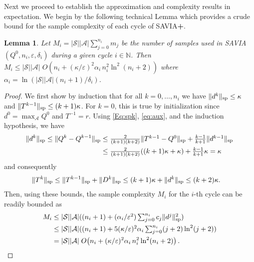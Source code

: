 \documentclass{article}
\newcommand{\cA}{\mathcal{A}}
\newcommand{\cS}{\mathcal{S}}
\newcommand{\NN}{\mathbb{N}}
\renewcommand{\sp}[1]{\|{#1}\|_\text{\rm sp}}
\newcommand{\R}{r}
\theoremstyle{plain}
\newtheorem{lemma}[theorem]{Lemma}
\theoremstyle{definition}
\theoremstyle{remark}
\begin{document}
Next we proceed to establish the approximation and complexity results in expectation. We begin by the following technical Lemma which provides a crude bound for the sample complexity of each cycle of {\rm SAVIA\textbf{+}}.

\begin{lemma}\label{le:rough}
Let $M_i= |\cS||\cA|\mbox{$\sum_{j=0}^{n_i} m_j$}$ be the number of samples used in
\mbox{\rm SAVIA}$(Q^0,n_i,\varepsilon,\delta_i)$ during a given cycle $i \in \NN$. Then
$M_i\leq |\cS||\cA|\;O\!\left (n_i+(\kappa/\varepsilon)^2\alpha_i\, n_i^2 \ln^2(n_i+2) \right )$
where $\alpha_i= \ln(|\cS||\cA|(n_i\!+\!1)/\delta_i)$.

\end{lemma}
\begin{proof}
We first show by induction that for all $k=0,\ldots,n_i$ we have $\sp{d^k} \le \kappa$ and $\sp{T^{k-1}} \le (k+1) \kappa$. For $k=0$, this is true by initialization since $d^0=\max_\cA Q^0$ and $T^{-1}=\R$. Using \eqref{Eq:spk}, \eqref{eq:aux}, and the induction hypothesis, we have
\begin{align*}
    \sp{d^k}\le \sp{Q^{k}-Q^{k-1}} &\le \mbox{$ \frac{2}{(k+1)(k+2)}\sp{T^{k-1}-Q^0} + \frac{k-1}{k+1}\sp{d^{k-1}}$}\\
    &\le \mbox{$\frac{2}{(k+1)(k+2)}((k+1)\kappa + \kappa) + \frac{k-1}{k+1}\kappa=\kappa$}
    \end{align*}
    and consequently
    \begin{align*}
    \sp{T^k}\leq\sp{T^{k-1}}+\sp{D^k}&\leq(k+1)\kappa+\sp{d^k}\leq(k+2)\kappa.
    \end{align*}
Then, using these bounds, the sample complexity $M_i$ for the $i$-th cycle can be readily bounded as
\begin{align*}
 M_i&\leq |\cS||\cA|(\mbox{$ (n_i+1)+(\alpha_i/\varepsilon^{2})\sum_{j=0}^{n_i} c_j\sp{d^j}^2$})\\
& \le \mbox{$|\cS||\cA|((n_i+1)+5(\kappa/\varepsilon)^2\alpha_i\sum_{j=0}^{n_i}(j+2)\ln^2(j+2))$}\\
 & =  |\cS||\cA|\;O\!\left (n_i+(\kappa/\varepsilon)^2\alpha_i \,n_i^2 \ln^2(n_i+2) \right ).
\end{align*}

\vspace{-5ex}
\end{proof}
\end{document}
